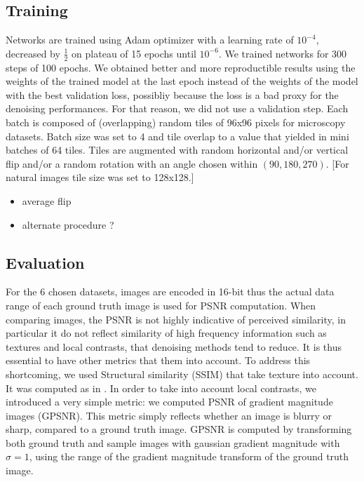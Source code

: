 \documentclass{article}
\begin{document}
\subsection{Training}
Networks are trained using Adam optimizer with a learning rate of $10^{-4}$, decreased by $\frac{1}{2}$ on plateau of 15 epochs until $10^{-6}$. We trained networks for 300 steps of 100 epochs.
We obtained better and more reproductible results using the weights of the trained model at the last epoch instead of the weights of the model with the best validation loss, possibliy because the loss is a bad proxy for the denoising performances. For that reason, we did not use a validation step.
Each batch is composed of (overlapping) random tiles of 96x96 pixels for microscopy datasets. Batch size was set to 4 and tile overlap to a value that yielded in mini batches of 64 tiles. Tiles are augmented with random horizontal and/or vertical flip and/or a random rotation with an angle chosen within $(90, 180, 270)$.
[For natural images tile size was set to 128x128.]
\begin{itemize}
\item average flip
\item alternate procedure ?
\end{itemize}

\subsection{Evaluation}
For the 6 chosen datasets, images are encoded in 16-bit thus the actual data range of each ground truth image is used for PSNR computation.
When comparing images, the PSNR is not highly indicative of perceived similarity, in particular it do not reflect similarity of high frequency information such as textures and local contrasts\cite{wang2004image}, that denoising methods tend to reduce. It is thus essential to have other metrics that them into account.
To address this shortcoming, we used Structural similarity (SSIM) that take texture into account. It was computed as in \cite{wang2004image}.
In order to take into account local contrasts, we introduced a very simple metric: we computed PSNR of gradient magnitude images (GPSNR). This metric simply reflects whether an image is blurry or sharp, compared to a ground truth image.
GPSNR is computed by transforming both ground truth and sample images with gaussian gradient magnitude with $\sigma=1$, using the range of the gradient magnitude transform of the ground truth image.
\end{document}
